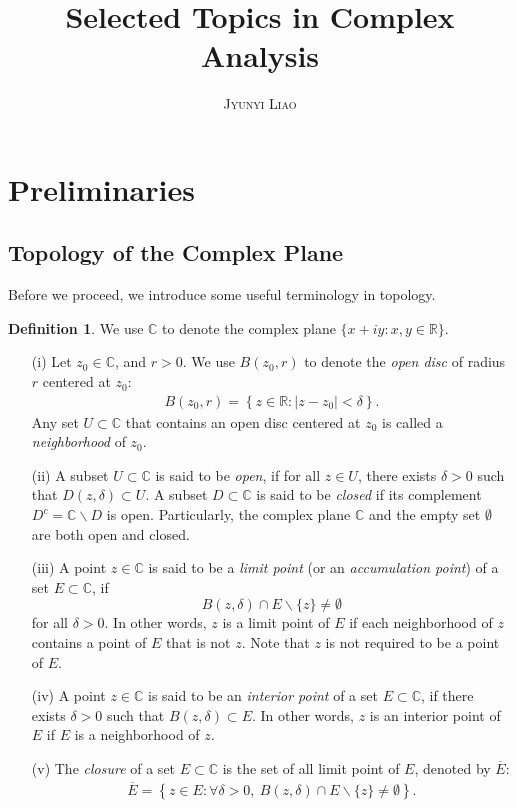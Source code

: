 \documentclass{article}
\title{\bf Selected Topics in Complex Analysis}
\author{\textsc{Jyunyi Liao}}
\date{}
\numberwithin{equation}{section}
\newcommand{\bbC}{\mathbb{C}}
\newcommand{\bbR}{\mathbb{R}}
\newcommand{\ol}{\overline}
\theoremstyle{plain}
\theoremstyle{definition}
\newtheorem{definition}[theorem]{Definition}
\begin{document}
\maketitle
\tableofcontents
\newpage
\section{Preliminaries}
\subsection{Topology of the Complex Plane}
Before we proceed, we introduce some useful terminology in topology.
\begin{definition}
We use $\bbC$ to denote the complex plane $\{x+iy:x,y\in\bbR\}$.
\begin{itemize}
\item[(i)] Let $z_0\in\bbC$, and $r>0$. We use $B(z_0,r)$ to denote the \textit{open disc} of radius $r$ centered at $z_0$:
\begin{align*}
	B(z_0,r)=\left\{z\in\bbR:\vert z-z_0\vert<\delta\right\}.
\end{align*}
Any set $U\subset\bbC$ that contains an open disc centered at $z_0$ is called a \textit{neighborhood} of $z_0$.
\item[(ii)] A subset $U\subset\bbC$ is said to be \textit{open}, if for all $z\in U$, there exists $\delta>0$ such that $D(z,\delta)\subset U$. A subset $D\subset\bbC$ is said to be \textit{closed} if its complement $D^c=\bbC\backslash D$ is open. Particularly, the complex plane $\bbC$ and the empty set $\emptyset$ are both open and closed.
\item[(iii)] A point $z\in\bbC$ is said to be a \textit{limit point} (or an \textit{accumulation point}) of a set $E\subset\bbC$, if $$B(z,\delta)\cap E\backslash\{z\}\neq\emptyset$$ for all $\delta>0$. In other words, $z$ is a limit point of $E$ if each neighborhood of $z$ contains a point of $E$ that is not $z$. Note that $z$ is not required to be a point of $E$.
\item[(iv)] A point $z\in\bbC$ is said to be an \textit{interior point} of a set $E\subset\bbC$, if there exists $\delta>0$ such that $B(z,\delta)\subset E$. In other words, $z$ is an interior point of $E$ if $E$ is a neighborhood of $z$.
\item[(v)] The \textit{closure} of a set $E\subset\bbC$ is the set of all limit point of $E$, denoted by $\ol{E}$:
\begin{align*}
	\ol{E}=\left\{z\in E:\forall\delta>0,\ B(z,\delta)\cap E\backslash\{z\}\neq\emptyset\right\}.

\end{align*}
\end{itemize}
\end{definition}
\end{document}

